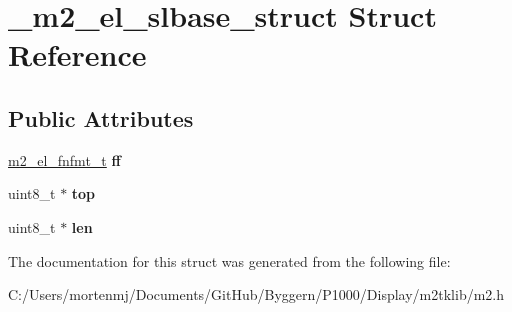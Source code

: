 \hypertarget{struct__m2__el__slbase__struct}{\section{\-\_\-m2\-\_\-el\-\_\-slbase\-\_\-struct Struct Reference}
\label{struct__m2__el__slbase__struct}
}
\subsection*{Public Attributes}
\begin{DoxyCompactItemize}
\item 
\hypertarget{struct__m2__el__slbase__struct_a40340a69a6bd32285e3a7d443165cdca}{\hyperlink{struct__m2__el__fnfmt__struct}{m2\-\_\-el\-\_\-fnfmt\-\_\-t} {\bfseries ff}}\label{struct__m2__el__slbase__struct_a40340a69a6bd32285e3a7d443165cdca}

\item 
\hypertarget{struct__m2__el__slbase__struct_a412093c1803827f4ac7dfe507465e563}{uint8\-\_\-t $\ast$ {\bfseries top}}\label{struct__m2__el__slbase__struct_a412093c1803827f4ac7dfe507465e563}

\item 
\hypertarget{struct__m2__el__slbase__struct_a0c1d573313b7b7c35840040777ea3ad0}{uint8\-\_\-t $\ast$ {\bfseries len}}\label{struct__m2__el__slbase__struct_a0c1d573313b7b7c35840040777ea3ad0}

\end{DoxyCompactItemize}


The documentation for this struct was generated from the following file\-:\begin{DoxyCompactItemize}
\item 
C\-:/\-Users/mortenmj/\-Documents/\-Git\-Hub/\-Byggern/\-P1000/\-Display/m2tklib/m2.\-h\end{DoxyCompactItemize}
